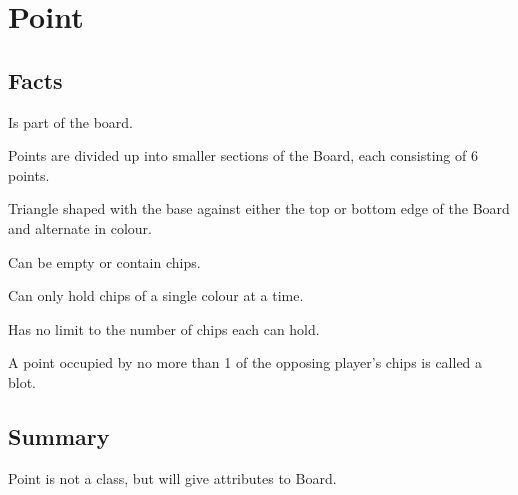 \section{Point}

\subsection{Facts}

\begin{dashed}
    \item Is part of the board.
    \item Points are divided up into smaller sections of the Board, each consisting of 6 points.
    \item Triangle shaped with the base against either the top or bottom edge of the Board and alternate in colour.
    \item Can be empty or contain chips.
    \item Can only hold chips of a single colour at a time.
    \item Has no limit to the number of chips each can hold.
    \item A point occupied by no more than 1 of the opposing player’s chips is called a blot.
\end{dashed}


\subsection{Summary}
Point is not a class, but will give attributes to Board.
